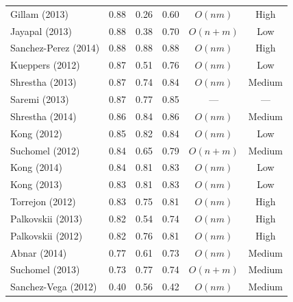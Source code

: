 \begin{table}[th]
\begin{tabular}{@{}l*{3}{c}cc@{}}
        Gillam (2013)   &       0.88            &    0.26       &  0.60             & $O(nm)$       & High              \\ %
       Jayapal (2013)   &       0.88            &    0.38       &  0.70             & $O(n+m)$      & Low               \\
 Sanchez-Perez (2014)   &       0.88            &    0.88       &  0.88             & $O(nm)$       & High              \\
      Kueppers (2012)   &       0.87            &    0.51       &  0.76             & $O(nm)$       & Low               \\
      Shrestha (2013)   &       0.87            &    0.74       &  0.84             & $O(nm)$       & Medium            \\
        Saremi (2013)   &       0.87            &    0.77       &  0.85             & ---           & ---               \\
      Shrestha (2014)   &       0.86            &    0.84       &  0.86             & $O(nm)$       & Medium            \\
          Kong (2012)   &       0.85            &    0.82       &  0.84             & $O(nm)$       & Low               \\
      Suchomel (2012)   &       0.84            &    0.65       &  0.79             & $O(n+m)$      & Medium            \\
          Kong (2014)   &       0.84            &    0.81       &  0.83             & $O(nm)$       & Low               \\
          Kong (2013)   &       0.83            &    0.81       &  0.83             & $O(nm)$       & Low               \\
      Torrejon (2012)   &       0.83            &    0.75       &  0.81             & $O(nm)$       & High              \\ %
    Palkovskii (2013)   &       0.82            &    0.54       &  0.74             & $O(nm)$       & High              \\
    Palkovskii (2012)   &       0.82            &    0.76       &  0.81             & $O(nm)$       & High              \\
         Abnar (2014)   &       0.77            &    0.61       &  0.73             & $O(nm)$       & Medium            \\
      Suchomel (2013)   &       0.73            &    0.77       &  0.74             & $O(n+m)$      & Medium            \\
  Sanchez-Vega (2012)   &       0.40            &    0.56       &  0.42             & $O(nm)$       & Medium            \\
\bottomrule
\end{tabular}

\end{table}

